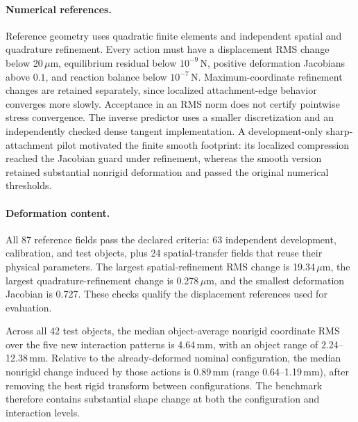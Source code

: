 \paragraph{Numerical references.}
Reference geometry uses quadratic finite elements and independent spatial and quadrature refinement. Every action must have a displacement RMS change below 20\,$\mu$m, equilibrium residual below $10^{-9}$\,N, positive deformation Jacobians above $0.1$, and reaction balance below $10^{-7}$\,N. Maximum-coordinate refinement changes are retained separately, since localized attachment-edge behavior converges more slowly. Acceptance in an RMS norm does not certify pointwise stress convergence. The inverse predictor uses a smaller discretization and an independently checked dense tangent implementation. A development-only sharp-attachment pilot motivated the finite smooth footprint: its localized compression reached the Jacobian guard under refinement, whereas the smooth version retained substantial nonrigid deformation and passed the original numerical thresholds.

\paragraph{Deformation content.}
All 87 reference fields pass the declared criteria: 63 independent development, calibration, and test objects, plus 24 spatial-transfer fields that reuse their physical parameters. The largest spatial-refinement RMS change is 19.34\,$\mu$m, the largest quadrature-refinement change is 0.278\,$\mu$m, and the smallest deformation Jacobian is 0.727. These checks qualify the displacement references used for evaluation.

Across all 42 test objects, the median object-average nonrigid coordinate RMS over the five new interaction patterns is 4.64\,mm, with an object range of 2.24--12.38\,mm. Relative to the already-deformed nominal configuration, the median nonrigid change induced by those actions is 0.89\,mm (range 0.64--1.19\,mm), after removing the best rigid transform between configurations. The benchmark therefore contains substantial shape change at both the configuration and interaction levels.

